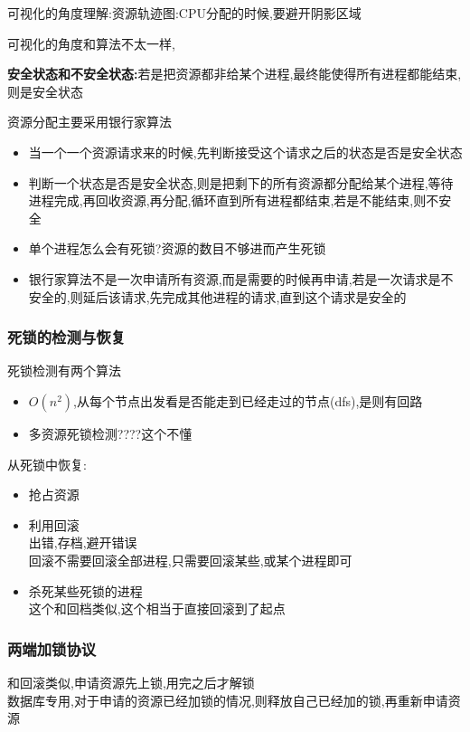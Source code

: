 \documentclass[UTF8,a4paper]{ctexart}
\begin{document}
  可视化的角度理解:资源轨迹图:CPU分配的时候,要避开阴影区域

  可视化的角度和算法不太一样,

  \textbf{安全状态和不安全状态:}若是把资源都非给某个进程,最终能使得所有进程都能结束,则是安全状态

  资源分配主要采用银行家算法

  \begin{itemize}
    \item 当一个一个资源请求来的时候,先判断接受这个请求之后的状态是否是安全状态
    \item 判断一个状态是否是安全状态,则是把剩下的所有资源都分配给某个进程,等待进程完成,再回收资源,再分配,循环直到所有进程都结束,若是不能结束,则不安全
    \item 单个进程怎么会有死锁?资源的数目不够进而产生死锁
    \item 银行家算法不是一次申请所有资源,而是需要的时候再申请,若是一次请求是不安全的,则延后该请求,先完成其他进程的请求,直到这个请求是安全的
  \end{itemize}

  \subsubsection{死锁的检测与恢复}
  死锁检测有两个算法
  \begin{itemize}
    \item $O(n^2)$,从每个节点出发看是否能走到已经走过的节点(dfs),是则有回路
    \item 多资源死锁检测????这个不懂
  \end{itemize}

  从死锁中恢复:
  \begin{itemize}
    \item 抢占资源
    \item 利用回滚\\
    出错,存档,避开错误\\
    回滚不需要回滚全部进程,只需要回滚某些,或某个进程即可
    \item 杀死某些死锁的进程\\
    这个和回档类似,这个相当于直接回滚到了起点
  \end{itemize}

  \subsubsection{两端加锁协议}
  和回滚类似,申请资源先上锁,用完之后才解锁\\
  数据库专用,对于申请的资源已经加锁的情况,则释放自己已经加的锁,再重新申请资源
\end{document}
